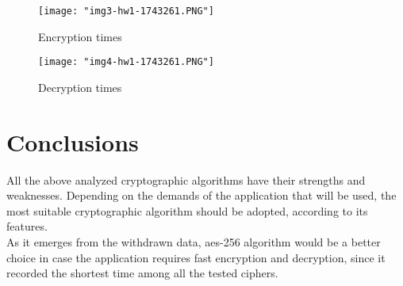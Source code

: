 \documentclass{article}
\begin{document}
\begin{figure}[!htb]
	\texttt{[image: "img3-hw1-1743261.PNG"]}
	\centering
	\caption{Encryption times}
	\end{figure}
\begin{figure} [!htb]
	\texttt{[image: "img4-hw1-1743261.PNG"]}
	\centering
	\caption{Decryption times}
\end{figure} 

\clearpage

\section{Conclusions}
All the above analyzed cryptographic algorithms have their strengths and weaknesses. Depending on the demands of the application that will be used, the most suitable cryptographic algorithm should be adopted, according to its features. \\
As it emerges from the withdrawn data, aes-256 algorithm would be a better choice in case the application requires fast encryption and decryption, since it recorded the shortest time among all the tested ciphers. \\
\end{document}
